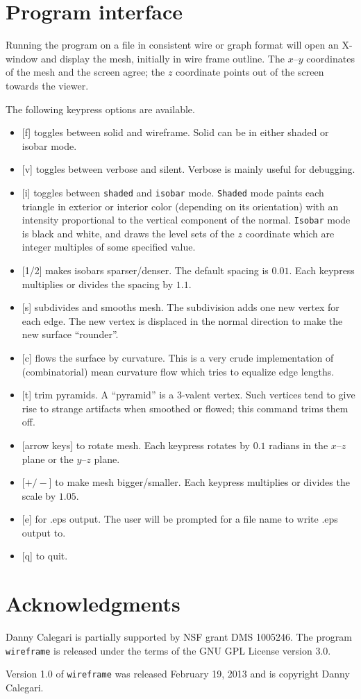 \documentclass[12pt]{article}
\begin{document}
\section{Program interface}\label{section:interface}

Running the program on a file in consistent wire or graph format will open an X-window
and display the mesh, initially in wire frame outline. The $x$--$y$ coordinates of the
mesh and the screen agree; the $z$ coordinate points out of the screen towards the viewer.

The following keypress options are available.

\begin{itemize}
\item{[f] toggles between solid and wireframe. Solid can be in either shaded or isobar mode.}
\item{[v] toggles between verbose and silent. Verbose is mainly useful for debugging.}
\item{[i] toggles between {\tt shaded} and {\tt isobar} mode. {\tt Shaded} mode paints each triangle in 
exterior or interior color (depending on its orientation) with an intensity proportional to the
vertical component of the normal. {\tt Isobar} mode is black and white, and draws the level
sets of the $z$ coordinate which are integer multiples of some specified value.}
\item{[1/2] makes isobars sparser/denser. The default spacing is $0.01$. Each keypress multiplies
or divides the spacing by $1.1$.}
\item{[s] subdivides and smooths mesh. The subdivision adds one new vertex for each edge. The new vertex
is displaced in the normal direction to make the new surface ``rounder''.}
\item{[c] flows the surface by curvature. This is a very crude implementation of (combinatorial) mean
curvature flow which tries to equalize edge lengths.}
\item{[t] trim pyramids. A ``pyramid'' is a 3-valent vertex. Such vertices tend to give rise to
strange artifacts when smoothed or flowed; this command trims them off.}
\item{[arrow keys] to rotate mesh. Each keypress rotates by $0.1$ radians in the $x$--$z$ plane or
the $y$--$z$ plane.}
\item{[$+/-$] to make mesh bigger/smaller. Each keypress multiplies or divides the scale by $1.05$.}
\item{[e] for .eps output. The user will be prompted for a file name to write .eps output to.}
\item{[q] to quit.}
\end{itemize}

\section{Acknowledgments}
Danny Calegari is partially supported by NSF grant DMS 1005246. The program {\tt wireframe} is
released under the terms of the GNU GPL License version 3.0.

\medskip

\noindent Version 1.0 of {\tt wireframe} was released February 19, 2013 and is copyright Danny Calegari.
\end{document}
